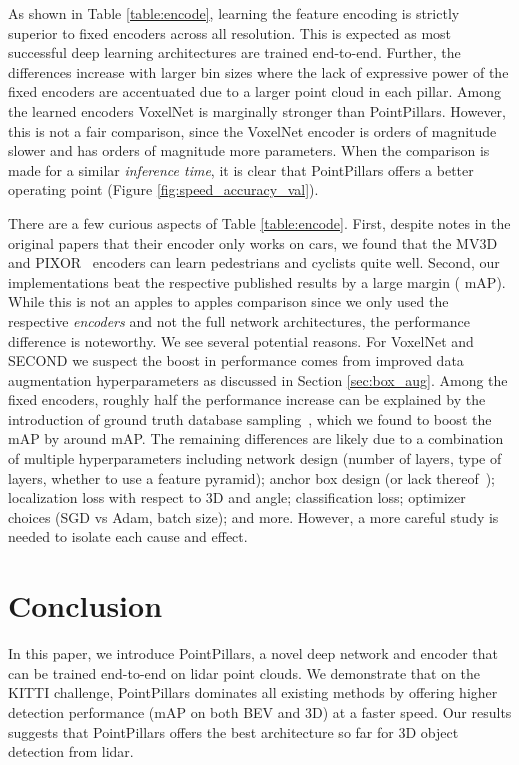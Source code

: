 \documentclass[10pt,twocolumn,letterpaper]{article}
\newcommand{\figref}[1]{Figure \ref{#1}}
\newcommand{\tableref}[1]{Table \ref{#1}}
\newcommand{\secref}[1]{Section \ref{#1}}
\newcommand{\squeeze}{\vspace{-0.5mm}}
\begin{document}
As shown in \tableref{table:encode}, learning the feature encoding is strictly superior to fixed encoders across all resolution.
This is expected as most successful deep learning architectures are trained end-to-end.
Further, the differences increase with larger bin sizes where the lack of expressive power of the fixed encoders are accentuated due to a larger point cloud in each pillar.
Among the learned encoders VoxelNet is marginally stronger than PointPillars.
However, this is not a fair comparison, since the VoxelNet encoder is orders of magnitude slower and has orders of magnitude more parameters.
When the comparison is made for a similar \emph{inference time}, it is clear that PointPillars offers a better operating point (\figref{fig:speed_accuracy_val}).

There are a few curious aspects of \tableref{table:encode}.
First, despite notes in the original papers that their encoder only works on cars, we found that the MV3D~\cite{mv3d} and PIXOR~\cite{pixor} encoders can learn pedestrians and cyclists quite well.
Second, our implementations beat the respective published results by a large margin ( mAP).
While this is not an apples to apples comparison since we only used the respective \emph{encoders} and not the full network architectures, the performance difference is noteworthy.
We see several potential reasons.
For VoxelNet and SECOND we suspect the boost in performance comes from improved data augmentation hyperparameters as discussed in \secref{sec:box_aug}.
Among the fixed encoders, roughly half the performance increase can be explained by the introduction of ground truth database sampling~\cite{second}, which we found to boost the mAP by around  mAP.
The remaining differences are likely due to a combination of multiple hyperparameters including network design (number of layers, type of layers, whether to use a feature pyramid); anchor box design (or lack thereof~\cite{pixor}); localization loss with respect to 3D and angle; classification loss; optimizer choices (SGD vs Adam, batch size); and more.
However, a more careful study is needed to isolate each cause and effect.

 
\squeeze
\section{Conclusion} \label{sec:conclusion}
\squeeze

In this paper, we introduce PointPillars, a novel deep network and encoder that can be trained end-to-end on lidar point clouds.
We demonstrate that on the KITTI challenge, PointPillars dominates all existing methods by offering higher detection performance (mAP on both BEV and 3D) at a faster speed.
Our results suggests that PointPillars offers the best architecture so far for 3D object detection from lidar.
 
{\small


}
\end{document}
